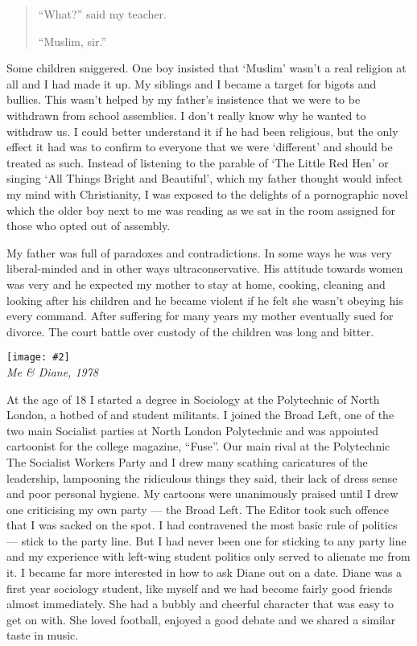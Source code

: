 \documentclass[12pt]{memoir}
\newcommand{\img}[3]{\begin{center}%
\texttt{[image: \#2]}\\{\small\em#3}%
\end{center}}
\begin{document}
\begin{quote}
“What?” said my teacher.

“Muslim, sir.”
\end{quote}

Some children sniggered.
One boy insisted that ‘Muslim’ wasn’t a real religion at all
and I had made it up.
My siblings and I became a target for bigots and bullies.
This wasn’t helped by my father’s insistence
that we were to be withdrawn from school assemblies.
I don’t really know why he wanted to withdraw us.
I could better understand it if he had been religious,
but the only effect it had was to confirm to everyone
that we were ‘different’ and should be treated as such.
Instead of listening to the parable of ‘The Little Red Hen’
or singing ‘All Things Bright and Beautiful’,
which my father thought would infect my mind with Christianity,
I was exposed to the delights of a pornographic novel
which the older boy next to me was reading
as we sat in the room assigned for those who opted out of assembly.

My father was full of paradoxes and contradictions.
In some ways he was very liberal-minded and in other ways ultra\–conservative.
His attitude towards women was very 
and he expected my mother to stay at home, cooking,
cleaning and looking after his children
and he became violent if he felt she wasn’t obeying his every command.
After suffering for many years my mother eventually sued for divorce.
The court battle over custody of the children was long and bitter.

\img{scale=0.3}{Hassan_and_Diane.jpg}
{Me \& Diane, 1978}

At the age of 18 I started a degree in Sociology
at the Polytechnic of North London,
a hotbed of 
and  student militants.
I joined the Broad Left, one of the two main Socialist parties
at North London Polytechnic and was appointed cartoonist
for the college magazine, “Fuse”.
Our main rival at the Polytechnic  The Socialist Workers Party
and I drew many scathing caricatures of the leadership,
lampooning the ridiculous things they said,
their lack of dress sense and poor personal hygiene.
My cartoons were unanimously praised until I drew one
criticising my own party — the Broad Left.
The Editor took such offence that I was sacked on the spot.
I had contravened the most basic rule of politics — stick to the party line.
But I had never been one for sticking to any party line
and my experience with left-wing student politics
only served to alienate me from it.
I became far more interested in how to ask Diane out on a date.
Diane was a first year sociology student,
like myself and we had become fairly good friends almost immediately.
She had a bubbly and cheerful character that was easy to get on with.
She loved football, enjoyed a good debate
and we shared a similar taste in music.
\end{document}
